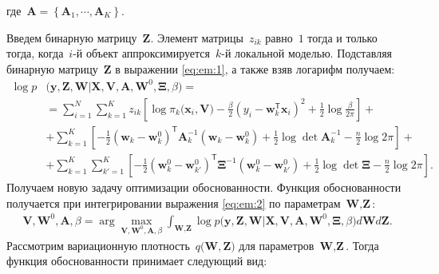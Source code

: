  где~$\mathbf{A} = \left\{\mathbf{A}_1, \cdots, \mathbf{A}_K\right\}.$
 
Введем бинарную матрицу~$\mathbf{Z}$. Элемент матрицы~$z_{ik}$ равно~$1$ тогда и только тогда, когда~$i$-й объект аппроксимируется~$k$-й локальной моделью.
Подставляя бинарную матрицу~$\mathbf{Z}$ в выражении \eqref{eq:em:1}, а также взяв логарифм получаем:
\[
\label{eq:em:2}
\begin{aligned}
\log p&\bigr(\mathbf{y}, \mathbf{Z}, \mathbf{W}|\mathbf{X}, \mathbf{V}, \textbf{A}, \textbf{W}^{0},  \bm{\Xi}, \beta\bigr) =\\
& = \sum_{i=1}^{N}\sum_{k=1}^{K}z_{ik}\left[\log\pi_k\bigr(\textbf{x}_i, \textbf{V}\bigr) - \frac{\beta}{2}\left(y_{i} - \textbf{w}_{k}^{\mathsf{T}}\textbf{x}_{i}\right)^{2} + \frac{1}{2}\log\frac{\beta}{2\pi}\right] +\\
&+ \sum_{k=1}^{K}\left[-\frac{1}{2}\left(\textbf{w}_{k} - \textbf{w}_{k}^{0}\right)^{\mathsf{T}}\textbf{A}_{k}^{-1}\left(\textbf{w}_{k} - \textbf{w}_{k}^{0}\right) + \frac{1}{2}\log\det\textbf{A}^{-1}_{k} - \frac{n}{2}\log2\pi\right]+\\
&+ \sum_{k=1}^{K}\sum_{k'=1}^{K}\left[-\frac{1}{2}\left(\textbf{w}_{k}^{0}-\textbf{w}_{k'}^{0}\right)^{\mathsf{T}}\bm{\Xi}^{-1}\left(\textbf{w}_{k}^{0}-\textbf{w}_{k'}^{0}\right) +\frac{1}{2}\log\det \bm{\Xi} -\frac{n}{2}\log{2\pi}\right].
\end{aligned}
\]
Получаем новую задачу оптимизации обоснованности. Функция обоснованности получается при интегрировании выражения \eqref{eq:em:2} по параметрам~$\textbf{W}, \textbf{Z}$:
\[
\label{eq:em:3}
\begin{aligned}
\mathbf{V}, \mathbf{W}^0, \textbf{A},  \beta = \arg\max_{\mathbf{V}, \mathbf{W}^0, \textbf{A}, \beta} \int_{\textbf{W}, \textbf{Z}}\log p\bigr(\mathbf{y}, \textbf{Z}, \textbf{W}|\mathbf{X}, \mathbf{V}, \textbf{A}, \textbf{W}^{0}, \bm{\Xi}, \beta\bigr)d\textbf{W}d\textbf{Z}.
\end{aligned}
\]
Рассмотрим вариационную плотность~$q\bigr(\textbf{W}, \textbf{Z}\bigr)$ для параметров~$\textbf{W}, \textbf{Z}$. Тогда функция обоснованности принимает следующий вид:
